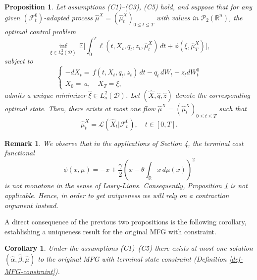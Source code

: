 \documentclass[11pt,a4paper]{article}
\newtheorem{prop}[theo]{Proposition}
\newtheorem{cor}[theo]{Corollary}
\newtheorem{rem}[theo]{Remark}
\begin{document}
\begin{prop}
\label{Lasry}
 Let assumptions \textnormal{(C1)--(C3), (C5)} hold,  and  suppose that for any given $(\mathcal{F}_t^0)$-adapted process $\hat \mu^X =(\hat \mu^X _t)_{0\leq t\leq T}$ with values in  $\mathcal{P}_2(\mathbb{R}^n) $, the optimal control problem 
 \begin{equation} \label{eq:opt_problem}
\inf_{\xi \in L^2_a(\mathcal{D})} \, \mathbb{E} \Bigg[  \int_0^T \ell(t, X_t, q_t, z_t ,  \hat \mu_t^X) \, dt + \phi(\xi, \hat \mu^X_T) \Bigg],
\end{equation}
subject to
\begin{equation}
\begin{cases}
    -dX_t =  \, f(t, X_t, q_t, z_t) \, dt - q_t \, dW_t-z_tdW_t^0\\  
X_0 =  \, a, \quad X_T = \xi,
\end{cases}
\end{equation}
admits a unique minimizer \( \hat \xi\in L^2_a(\mathcal{D})\). Let $( \hat X, \hat q, \hat z )$ denote the corresponding optimal state. Then, there exists at most one flow $\hat \mu^X=(\hat \mu_t^X)_{0\leq t\leq T}$ such that
\begin{equation}
\label{cons}
  \hat \mu_t^X=\mathcal{L}(\hat X_t|\mathcal{F}_t^0), \quad t \in [0, T]. 
\end{equation}
\end{prop}


\begin{rem}\label{Lasry-appl} 
We observe that in the applications of Section 4, the terminal cost functional
\[
\phi(x,\mu) = -x + \frac{\gamma}{2}\left(x - \theta \int_{\mathbb R}x\,d\mu(x)\right)^2
\]
is not monotone in the sense of Lasry-Lions. Consequently, Proposition \ref{Lasry} is not applicable. Hence, in order to get uniqueness we will rely on a contraction argument instead.
\end{rem}

A direct consequence of the previous two propositions is the following corollary, establishing a uniqueness result for the original MFG with constraint.
\begin{cor}
\label{uniquealpha}
Under the assumptions \textnormal{(C1)--(C5)}  there exists at most one solution $(\hat{\alpha}, \hat{\beta}, \hat{\mu})$ to the original MFG with terminal state constraint (Definition \ref{def-MFG-constraint}). 
\end{cor}
\end{document}
